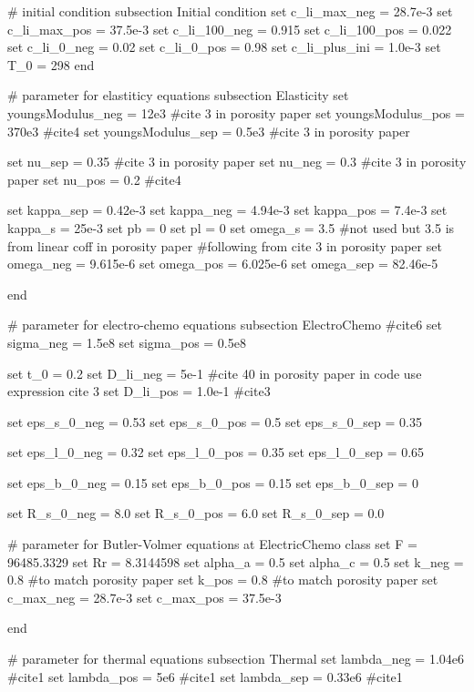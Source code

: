 \begin{DoxyCode}
\textcolor{preprocessor}{# initial condition}
\textcolor{preprocessor}{}subsection Initial condition
set c\_li\_max\_neg = 28.7e-3
set c\_li\_max\_pos = 37.5e-3
set c\_li\_100\_neg = 0.915
set c\_li\_100\_pos = 0.022
set c\_li\_0\_neg = 0.02
set c\_li\_0\_pos = 0.98
set c\_li\_plus\_ini = 1.0e-3
set T\_0 = 298
end

\textcolor{preprocessor}{# parameter for elastiticy equations}
\textcolor{preprocessor}{}subsection Elasticity
set youngsModulus\_neg = 12e3 #cite 3 in porosity paper
set youngsModulus\_pos = 370e3 #cite4
set youngsModulus\_sep = 0.5e3 #cite 3 in porosity paper

set nu\_sep = 0.35 #cite 3 in porosity paper
set nu\_neg = 0.3 #cite 3 in porosity paper
set nu\_pos = 0.2 #cite4 

set kappa\_sep = 0.42e-3
set kappa\_neg = 4.94e-3
set kappa\_pos = 7.4e-3
set kappa\_s = 25e-3
set pb = 0
set pl = 0
set omega\_s = 3.5 #not used but 3.5 is from linear coff in porosity paper
\textcolor{preprocessor}{#following from cite 3 in porosity paper}
\textcolor{preprocessor}{}set omega\_neg = 9.615e-6 
set omega\_pos = 6.025e-6
set omega\_sep = 82.46e-5

end

\textcolor{preprocessor}{# parameter for electro-chemo equations}
\textcolor{preprocessor}{}subsection ElectroChemo #cite6
set sigma\_neg = 1.5e8
set sigma\_pos = 0.5e8

set t\_0 = 0.2
set D\_li\_neg = 5e-1 #cite 40 in porosity paper in code use expression cite 3 
set D\_li\_pos = 1.0e-1 #cite3

set eps\_s\_0\_neg = 0.53
set eps\_s\_0\_pos = 0.5
set eps\_s\_0\_sep = 0.35

set eps\_l\_0\_neg = 0.32
set eps\_l\_0\_pos = 0.35
set eps\_l\_0\_sep = 0.65

set eps\_b\_0\_neg = 0.15
set eps\_b\_0\_pos = 0.15
set eps\_b\_0\_sep = 0

set R\_s\_0\_neg = 8.0
set R\_s\_0\_pos = 6.0
set R\_s\_0\_sep = 0.0

# parameter \textcolor{keywordflow}{for} Butler-Volmer equations at ElectricChemo \textcolor{keyword}{class}
set F = 96485.3329
set Rr = 8.3144598
set alpha\_a = 0.5
set alpha\_c = 0.5
set k\_neg = 0.8 #to match porosity paper
set k\_pos = 0.8 #to match porosity paper
set c\_max\_neg = 28.7e-3
set c\_max\_pos = 37.5e-3

end

\textcolor{preprocessor}{# parameter for thermal equations}
\textcolor{preprocessor}{}subsection Thermal
set lambda\_neg = 1.04e6 #cite1
set lambda\_pos = 5e6  #cite1
set lambda\_sep = 0.33e6  #cite1



\end{DoxyCode}
